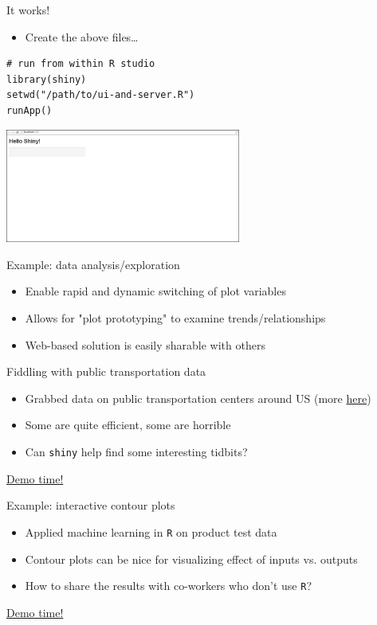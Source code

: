 \documentclass[sans,aspectratio=169,presentation,bigger,fleqn]{beamer}
\begin{document}
\begin{frame}[fragile,label=sec-5]{It works!}
 \begin{itemize}
\item Create the above files\ldots{}
\end{itemize}

\scriptsize
\begin{verbatim}
# run from within R studio
library(shiny)
setwd("/path/to/ui-and-server.R")
runApp()
\end{verbatim}

\begin{center}
\includegraphics[height=3.75cm]{./img/shiny-template.png}
\end{center}
\end{frame}
\begin{frame}[label=sec-6]{Example: data analysis/exploration}
\begin{itemize}
\item Enable rapid and dynamic switching of plot variables
\item Allows for "plot prototyping" to examine trends/relationships
\item Web-based solution is easily sharable with others
\end{itemize}
\end{frame}
\begin{frame}[fragile,label=sec-7]{Fiddling with public transportation data}
 \begin{itemize}
\item Grabbed data on public transportation centers around US (more \href{https://github.com/tcrug/public-transpo}{here})
\item Some are quite efficient, some are horrible
\item Can \texttt{shiny} help find some interesting tidbits?
\end{itemize}

\pause

\href{http://jwhendy.shinyapps.io/transpo-exploration/}{\alert{Demo time!}}
\end{frame}
\begin{frame}[fragile,label=sec-8]{Example: interactive contour plots}
 \begin{itemize}
\item Applied machine learning in \texttt{R} on product test data
\item Contour plots can be nice for visualizing effect of inputs vs. outputs
\item How to share the results with co-workers who don't use \texttt{R}?
\end{itemize}

\pause

\href{http://spark.rstudio.com/jwhendy/interactive-contour/}{\alert{Demo time!}}
\end{frame}
\end{document}
